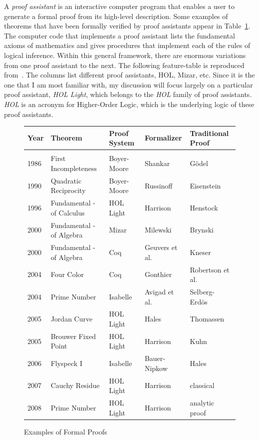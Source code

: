 \documentclass{llncs}
\begin{document}

A {\it proof assistant} is an interactive computer program that
enables a user to generate a formal proof from its high-level
description.  Some examples of theorems that have been formally
verified by proof assistants appear in Table~\ref{fig:table}.  The
computer code that implements a proof assistant lists the fundamental
axioms of mathematics and gives procedures that implement each of the
rules of logical inference.  Within this general framework, there are
enormous variations from one proof assistant to the next. The
following feature-table is reproduced from~\cite{wiedijk:17}.  The
columns list different proof assistants, HOL, Mizar, etc.  Since it is
the one that I am most familiar with, my discussion will focus largely
on a particular proof assistant, {\it HOL Light}, which belongs to the
{\it HOL} family of proof assistants. {\it HOL} is an acronym for
Higher-Order Logic, which is the underlying logic of these proof
assistants.


\begin{figure}[h!]
\centering
\begin{tabular}{l l l l l}
\hline
Year\hspace{0.5em} &Theorem\hspace{8em} &Proof System\hspace{2em}  &Formalizer\hspace{3em} &Traditional Proof\\ [0.5ex]
\hline \\
1986 &First Incompleteness &Boyer-Moore   &Shankar &G\"odel \\
1990 &Quadratic Reciprocity&Boyer-Moore &Russinoff &Eisenstein\\
1996 &Fundamental - of Calculus &HOL Light &Harrison &Henstock\\
2000 &Fundamental - of Algebra &Mizar &Milewski    &Brynski\\ 
2000 &Fundamental - of Algebra &Coq &Geuvers et al.   &Kneser\\
2004 &Four Color &Coq &Gonthier &Robertson et al.\\
2004 &Prime Number &Isabelle &Avigad et al. &Selberg-Erd\"os\\
2005 &Jordan Curve  &HOL Light &Hales &Thomassen \\
2005 &Brouwer Fixed Point &HOL Light &Harrison &Kuhn \\
2006 &Flyspeck I &Isabelle &Bauer-Nipkow &Hales \\
2007 &Cauchy Residue &HOL Light &Harrison &classical \\
2008 &Prime Number &HOL Light &Harrison &analytic proof \\
 [1ex]
\hline
\end{tabular}
\caption{Examples of Formal Proofs}
\label{fig:table}
\end{figure}
\end{document}

